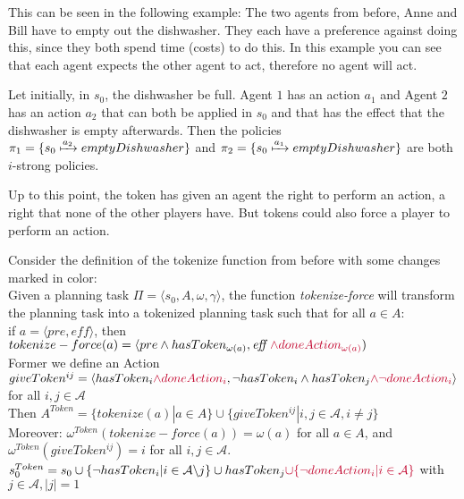 %

This can be seen in the following example: The two agents from before, Anne and Bill have to empty out the dishwasher. They each have a preference against doing this, since they both spend time (costs) to do this.
In this example you can see that each agent expects the other agent to act, therefore no agent will act.

Let initially, in $s_0$, the dishwasher be full. Agent $1$ has an action $a_1$ and Agent $2$ has an action $a_2$ that can both be applied in $s_0$ and that has the effect that the dishwasher is empty afterwards. Then the policies $\pi_1 = \{s_0 \xmapsto{a_2} emptyDishwasher \}$ and $\pi_2 = \{s_0 \xmapsto{a_1} emptyDishwasher \}$ are both $i$-strong policies.


Up to this point, the token has given an agent the right to perform an action, a right that none of the other players have. But tokens could also force a player to perform an action.

Consider the definition of the tokenize function from before with some changes marked in color: \\
Given a planning task $\Pi = \langle s_0, A, \omega, \gamma \rangle $, the function \textit{tokenize-force} will transform the planning task into a tokenized planning task such that for all $a \in A$: \\
 if $a = \langle pre, \textit{eff} \rangle$, then
   $tokenize-force(a) =\langle pre \wedge hasToken_{\omega(a)}, \textit{eff } {\color{UniRed} \wedge doneAction_{\omega(a)}})$ \\
Former we define an Action
    $ giveToken^{ij} = \langle hasToken_i {\color{UniRed}\wedge doneAction_i}, \neg hasToken_i \wedge hasToken_j {\color{UniRed} \wedge \neg doneAction_i} \rangle $
    for all $i,j \in \mathcal{A}$
    \\
Then $ A^{Token}=\{tokenize(a)|a \in A\} \cup \{giveToken^{ij}|i,j \in \mathcal{A}, i \not = j\}
$ \\
Moreover: $\omega^{Token}(tokenize-force(a))= \omega(a)$ for all $a \in A$,
and $\omega^{Token}(giveToken^{ij}) = i$ for all $i,j \in \mathcal{A}$. \\
$s_0^{Token} = s_0 \cup \{\neg hasToken_i|i \in \mathcal{A} \backslash j\} \cup hasToken_j {\color{UniRed} \cup  \{ \neg doneAction_i| i \in \mathcal{A} \}}$ with $j \in \mathcal{A}, |j|=1$\\

